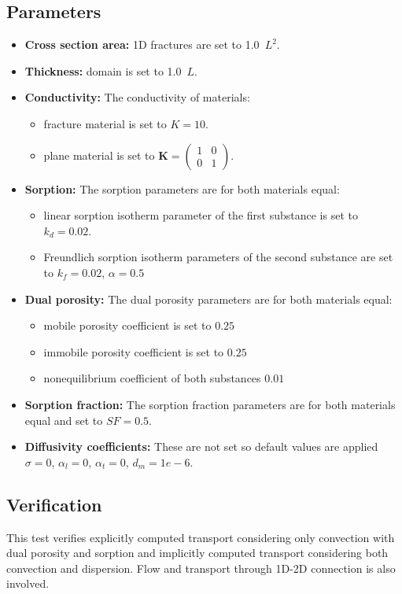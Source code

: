 \subsection*{Parameters}
\begin{itemize}
  \item \textbf{Cross section area:} 1D fractures are set to 1.0~$L^2$.
  \item \textbf{Thickness:} domain is set to 1.0~$L$.
  \item \textbf{Conductivity:} The conductivity of materials:
    \begin{itemize}
      \item fracture material is set to $K=10$.
      \item plane material is set to $\mathbf{K}=\left(\begin{array}{cc} 1 & 0 \\ 0 & 1\end{array} \right)$.
    \end{itemize}
  \item \textbf{Sorption:} The sorption parameters are for both materials equal:
    \begin{itemize}
      \item linear sorption isotherm parameter of the first substance is set to $k_d=0.02$.
      \item Freundlich sorption isotherm parameters of the second substance are set to $k_f=0.02$, $\alpha=0.5$  
    \end{itemize}
  \item \textbf{Dual porosity:} The dual porosity parameters are for both materials equal:
    \begin{itemize}
      \item mobile porosity coefficient is set to $0.25$
      \item immobile porosity coefficient is set to $0.25$
      \item nonequilibrium coefficient of both substances $0.01$
    \end{itemize}
  \item \textbf{Sorption fraction:} The sorption fraction parameters are for both materials equal and set to $SF=0.5$.
  \item \textbf{Diffusivity coefficients:} These are not set so default values are applied 
	$\sigma=0$, $\alpha_l=0$, $\alpha_t=0$, $d_m=1e-6$.
\end{itemize}

\subsection*{Verification}
This test verifies explicitly computed transport considering only convection with dual porosity and sorption and implicitly computed transport considering both convection and dispersion. Flow and transport through 1D-2D connection is also involved.


